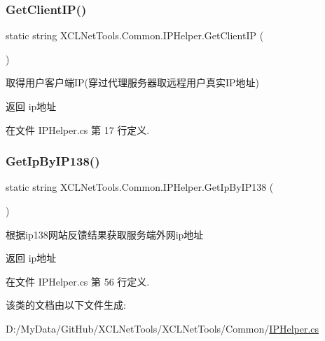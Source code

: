 \subsubsection{\texorpdfstring{Get\+Client\+I\+P()}{GetClientIP()}}
{\footnotesize\ttfamily static string X\+C\+L\+Net\+Tools.\+Common.\+I\+P\+Helper.\+Get\+Client\+IP (\begin{DoxyParamCaption}{ }\end{DoxyParamCaption})\hspace{0.3cm}{\ttfamily [static]}}



取得用户客户端\+IP(穿过代理服务器取远程用户真实\+I\+P地址) 

\begin{DoxyReturn}{返回}
ip地址
\end{DoxyReturn}


在文件 I\+P\+Helper.\+cs 第 17 行定义.

\mbox{\label{class_x_c_l_net_tools_1_1_common_1_1_i_p_helper_a578759afdfe7ee27b6ff5410e073bdd9}} 
\subsubsection{\texorpdfstring{Get\+Ip\+By\+I\+P138()}{GetIpByIP138()}}
{\footnotesize\ttfamily static string X\+C\+L\+Net\+Tools.\+Common.\+I\+P\+Helper.\+Get\+Ip\+By\+I\+P138 (\begin{DoxyParamCaption}{ }\end{DoxyParamCaption})\hspace{0.3cm}{\ttfamily [static]}}



根据ip138网站反馈结果获取服务端外网ip地址 

\begin{DoxyReturn}{返回}
ip地址
\end{DoxyReturn}


在文件 I\+P\+Helper.\+cs 第 56 行定义.



该类的文档由以下文件生成\+:\begin{DoxyCompactItemize}
\item 
D\+:/\+My\+Data/\+Git\+Hub/\+X\+C\+L\+Net\+Tools/\+X\+C\+L\+Net\+Tools/\+Common/\hyperlink{_i_p_helper_8cs}{I\+P\+Helper.\+cs}\end{DoxyCompactItemize}
